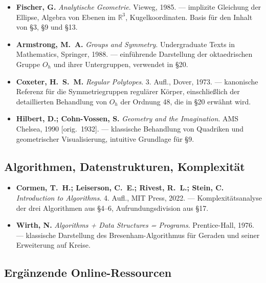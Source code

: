 \documentclass[12pt,a4paper]{scrartcl}
\begin{document}
\begin{itemize}[leftmargin=1.4em,itemsep=0.3em,topsep=0.3em]
  \item \textbf{Fischer, G.} \emph{Analytische Geometrie}. Vieweg, 1985.
        --- implizite Gleichung der Ellipse, Algebra von Ebenen im $\mathbb{R}^3$,
        Kugelkoordinaten. Basis für den Inhalt von §3, §9 und §13.

  \item \textbf{Armstrong, M.~A.} \emph{Groups and Symmetry}. Undergraduate Texts in
        Mathematics, Springer, 1988.
        --- einführende Darstellung der oktaedrischen Gruppe $O_h$ und ihrer Untergruppen, verwendet in §20.

  \item \textbf{Coxeter, H.~S.~M.} \emph{Regular Polytopes}. 3. Aufl., Dover, 1973.
        --- kanonische Referenz für die Symmetriegruppen regulärer Körper, einschließlich der detaillierten Behandlung von $O_h$ der Ordnung 48, die in §20 erwähnt wird.

  \item \textbf{Hilbert, D.; Cohn-Vossen, S.} \emph{Geometry and the Imagination}.
        AMS Chelsea, 1990 [orig.~1932].
        --- klassische Behandlung von Quadriken und geometrischer Visualisierung, intuitive Grundlage für §9.
\end{itemize}

\subsection*{Algorithmen, Datenstrukturen, Komplexität}

\begin{itemize}[leftmargin=1.4em,itemsep=0.3em,topsep=0.3em]
  \item \textbf{Cormen, T.~H.; Leiserson, C.~E.; Rivest, R.~L.; Stein, C.}
        \emph{Introduction to Algorithms}. 4. Aufl., MIT Press, 2022.
        --- Komplexitätsanalyse der drei Algorithmen aus §4--6, Aufrundungsdivision aus §17.

  \item \textbf{Wirth, N.} \emph{Algorithms + Data Structures = Programs}.
        Prentice-Hall, 1976.
        --- klassische Darstellung des Bresenham-Algorithmus für Geraden und seiner Erweiterung auf Kreise.
\end{itemize}

\subsection*{Ergänzende Online-Ressourcen}
\end{document}
